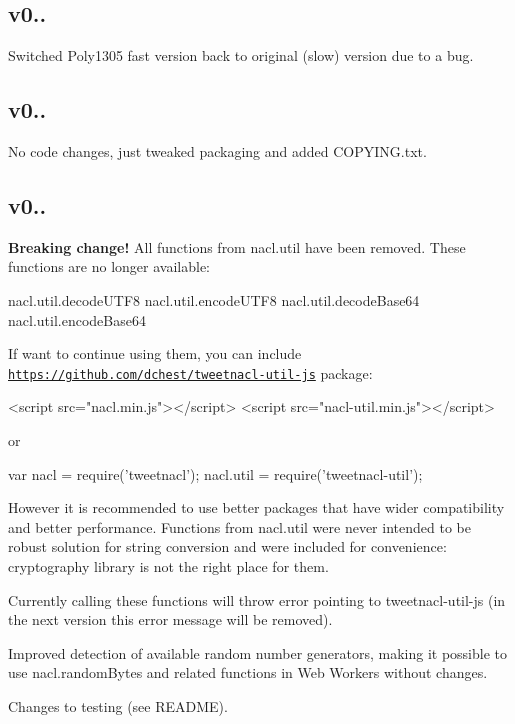 \subsection*{v0.. }

Switched Poly1305 fast version back to original (slow) version due to a bug.

\subsection*{v0.. }

No code changes, just tweaked packaging and added C\+O\+P\+Y\+I\+N\+G.\+txt.

\subsection*{v0.. }


\begin{DoxyItemize}
\item {\bfseries Breaking change!} All functions from {\ttfamily nacl.\+util} have been removed. These functions are no longer available\+: \begin{DoxyVerb}nacl.util.decodeUTF8
nacl.util.encodeUTF8
nacl.util.decodeBase64
nacl.util.encodeBase64
\end{DoxyVerb}


If want to continue using them, you can include \href{https://github.com/dchest/tweetnacl-util-js}{\tt https\+://github.\+com/dchest/tweetnacl-\/util-\/js} package\+: \begin{DoxyVerb}<script src="nacl.min.js"></script>
<script src="nacl-util.min.js"></script>
\end{DoxyVerb}


or \begin{DoxyVerb}var nacl = require('tweetnacl');
nacl.util = require('tweetnacl-util');
\end{DoxyVerb}


However it is recommended to use better packages that have wider compatibility and better performance. Functions from {\ttfamily nacl.\+util} were never intended to be robust solution for string conversion and were included for convenience\+: cryptography library is not the right place for them.

Currently calling these functions will throw error pointing to {\ttfamily tweetnacl-\/util-\/js} (in the next version this error message will be removed).
\item Improved detection of available random number generators, making it possible to use {\ttfamily nacl.\+random\+Bytes} and related functions in Web Workers without changes.
\item Changes to testing (see R\+E\+A\+D\+ME).
\end{DoxyItemize}

